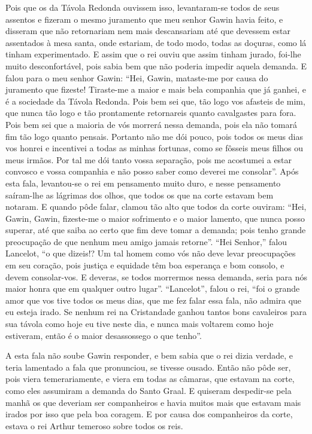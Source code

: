 Pois que os da Távola Redonda ouvissem isso, levantaram-se todos de seus
assentos e fizeram o mesmo juramento que meu senhor Gawin havia feito, e
disseram que não retornariam nem mais descansariam até que devessem estar
assentados à mesa santa, onde estariam, de todo modo, todas as doçuras, como lá
tinham experimentado. E assim que o rei ouviu que assim tinham jurado, foi-lhe
muito desconfortável, pois sabia bem que não poderia impedir aquela demanda. E
falou para o meu senhor Gawin: “Hei, Gawin, mataste-me por causa do juramento
que fizeste! Tiraste-me a maior e mais bela companhia que já ganhei, e é a
sociedade da Távola Redonda. Pois bem sei que, tão logo vos afasteis de mim,
que nunca tão logo e tão prontamente retornareis quanto cavalgastes para fora.
Pois bem sei que a maioria de vós morrerá nessa demanda, pois ela não tomará
fim tão logo quanto pensais. Portanto não me dói pouco, pois todos os
meus dias vos honrei e incentivei a todas as minhas fortunas, como se fôsseis
meus filhos ou meus irmãos. Por tal me dói tanto vossa separação, pois me
acostumei a estar convosco e vossa companhia e não posso saber como deverei me
consolar”. Após esta fala, levantou-se o rei em pensamento muito duro,
e nesse pensamento saíram-lhe as lágrimas dos olhos, que todos os que na corte
estavam bem notaram. E quando pôde falar, clamou tão alto que todos da corte
ouviram: “Hei, Gawin, Gawin, fizeste-me o maior sofrimento e o maior lamento,
que nunca posso superar, até que saiba ao certo que fim deve tomar a demanda;
pois tenho grande preocupação de que nenhum meu amigo jamais retorne”. “Hei
Senhor,” falou Lancelot, “o que dizeis!? Um tal homem como vós não deve levar
preocupações em seu coração, pois justiça e equidade têm boa esperança e bom
consolo, e devem consolar-vos. E deveras, se todos morrermos nessa demanda,
seria para nós maior honra que em qualquer outro lugar”. “Lancelot”, falou o
rei, “foi o grande amor que vos tive todos os meus dias, que me fez falar essa
fala, não admira que eu esteja irado. Se nenhum rei na Cristandade ganhou
tantos bons cavaleiros para sua távola como hoje eu tive neste dia, e nunca
mais voltarem como hoje estiveram, então é o maior desassossego o que tenho”. 

A esta fala não soube Gawin responder, e bem sabia que o rei dizia verdade, e
teria lamentado a fala que pronunciou, se tivesse ousado. Então não pôde ser,
pois viera temerariamente, e viera em todas as câmaras, que estavam na corte,
como eles assumiram a demanda do Santo Graal. E quiseram despedir-se pela manhã
os que deveriam ser companheiros e havia muitos mais que estavam mais irados
por isso que pela boa coragem. E por causa dos companheiros da corte, estava o
rei Arthur temeroso sobre todos os reis. 

